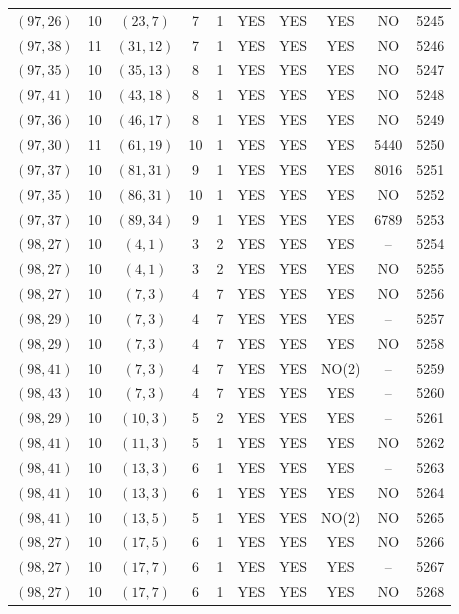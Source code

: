 \begin{longtable}{|c|c|c|c|c|c|c|c|c|c|}
$(97, 26)$ & 10 & $(23, 7)$ & 7 & 1 & YES & YES & YES & NO & 5245\\
$(97, 38)$ & 11 & $(31, 12)$ & 7 & 1 & YES & YES & YES & NO & 5246\\
$(97, 35)$ & 10 & $(35, 13)$ & 8 & 1 & YES & YES & YES & NO & 5247\\
$(97, 41)$ & 10 & $(43, 18)$ & 8 & 1 & YES & YES & YES & NO & 5248\\
$(97, 36)$ & 10 & $(46, 17)$ & 8 & 1 & YES & YES & YES & NO & 5249\\
$(97, 30)$ & 11 & $(61, 19)$ & 10 & 1 & YES & YES & YES & 5440 & 5250\\
$(97, 37)$ & 10 & $(81, 31)$ & 9 & 1 & YES & YES & YES & 8016 & 5251\\
$(97, 35)$ & 10 & $(86, 31)$ & 10 & 1 & YES & YES & YES & NO & 5252\\
$(97, 37)$ & 10 & $(89, 34)$ & 9 & 1 & YES & YES & YES & 6789 & 5253\\
$(98, 27)$ & 10 & $(4, 1)$ & 3 & 2 & YES & YES & YES & -- & 5254\\
$(98, 27)$ & 10 & $(4, 1)$ & 3 & 2 & YES & YES & YES & NO & 5255\\
$(98, 27)$ & 10 & $(7, 3)$ & 4 & 7 & YES & YES & YES & NO & 5256\\
$(98, 29)$ & 10 & $(7, 3)$ & 4 & 7 & YES & YES & YES & -- & 5257\\
$(98, 29)$ & 10 & $(7, 3)$ & 4 & 7 & YES & YES & YES & NO & 5258\\
$(98, 41)$ & 10 & $(7, 3)$ & 4 & 7 & YES & YES & NO(2) & -- & 5259\\
$(98, 43)$ & 10 & $(7, 3)$ & 4 & 7 & YES & YES & YES & -- & 5260\\
$(98, 29)$ & 10 & $(10, 3)$ & 5 & 2 & YES & YES & YES & -- & 5261\\
$(98, 41)$ & 10 & $(11, 3)$ & 5 & 1 & YES & YES & YES & NO & 5262\\
$(98, 41)$ & 10 & $(13, 3)$ & 6 & 1 & YES & YES & YES & -- & 5263\\
$(98, 41)$ & 10 & $(13, 3)$ & 6 & 1 & YES & YES & YES & NO & 5264\\
$(98, 41)$ & 10 & $(13, 5)$ & 5 & 1 & YES & YES & NO(2) & NO & 5265\\
$(98, 27)$ & 10 & $(17, 5)$ & 6 & 1 & YES & YES & YES & NO & 5266\\
$(98, 27)$ & 10 & $(17, 7)$ & 6 & 1 & YES & YES & YES & -- & 5267\\
$(98, 27)$ & 10 & $(17, 7)$ & 6 & 1 & YES & YES & YES & NO & 5268\\

\end{longtable}
